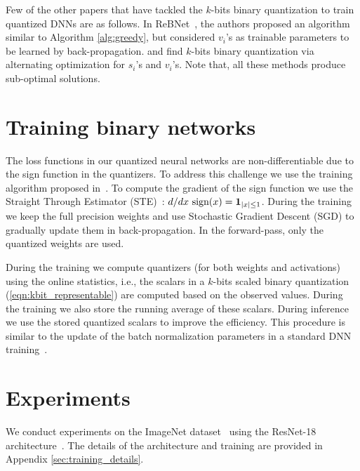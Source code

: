 \documentclass[10pt,twocolumn,letterpaper]{article}
\begin{document}
Few of the other papers that have tackled the $k$-bits binary quantization to train quantized DNNs are as follows.
In ReBNet~\cite{ghasemzadeh2018rebnet}, the authors proposed an algorithm similar to Algorithm \ref{alg:greedy}, but considered $v_i$'s as trainable parameters to be learned by back-propagation. \cite{lin2017towards} and \cite{zhang2018lq} find $k$-bits binary quantization via alternating optimization for $s_i$'s and $v_i$'s.
Note that, all these methods produce sub-optimal solutions.


\section{Training binary networks} \label{sec:train_and_deploy}
The loss functions in our quantized neural networks are non-differentiable due to the sign function in the quantizers.
To address this challenge we use the training algorithm proposed in~\cite{courbariaux2015binaryconnect}. To compute the gradient of the sign function we use the Straight Through Estimator (STE)~\cite{bengio2013estimating}: $d/dx ~ \text{sign}(x) = {\bf 1}_{|x|\le 1}$. During the training we keep the full precision weights and use Stochastic Gradient Descent (SGD) to gradually update them in back-propagation. In the forward-pass, only the quantized weights are used.

During the training we compute quantizers (for both weights and activations) using the online statistics, i.e., the scalars in a $k$-bits scaled binary quantization (\ref{eqn:kbit_representable}) are computed based on the observed values. During the training we also store the running average of these scalars. During inference we use the stored quantized scalars to improve the efficiency. This procedure is similar to the update of the batch normalization parameters in a standard DNN training~\cite{ioffe2015batch}.

\section{Experiments} \label{sec:experiments}
We conduct experiments on the ImageNet dataset~\cite{deng2009imagenet} using the ResNet-18 architecture~\cite{he2016deep}. The details of the architecture and training are provided in Appendix \ref{sec:training_details}. 
\end{document}
